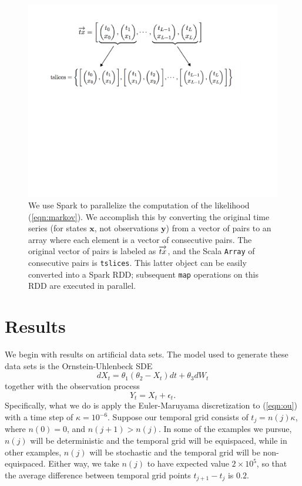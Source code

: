 \documentclass[wcp]{jmlr}
\begin{document}
\begin{figure}[ht]
\begin{center}
\includegraphics[width=6in]{vec_to_slice}
\end{center}
\caption{We use Spark to parallelize the computation of the likelihood
(\ref{eqn:markov}).  We accomplish this by converting the
original time series (for states $\mathbf{x}$, not observations
$\mathbf{y}$) from a vector of pairs to an array where each element is
a vector of consecutive pairs.  The original vector of pairs is
labeled as $\protect\overrightarrow{tx}$, and the Scala \texttt{Array}
of consecutive pairs is \texttt{tslices}.  This latter object can be
easily converted into a Spark RDD; subsequent \texttt{map} operations
on this RDD are executed in parallel.}
\label{fig:implementation2}
\end{figure}

\section{Results}
\label{sect:results}
We begin with results on artificial data sets.  The model used to
generate these data sets is the Ornstein-Uhlenbeck SDE
\begin{equation}
\label{eqn:ou}
{d}X_t = \theta_1 (\theta_2 - X_t) {d}t + \theta_3 {d}W_t
\end{equation}
together with the observation process
\begin{equation}
\label{eqn:ou_obs}
Y_t = X_t + \epsilon_t.
\end{equation}
Specifically, what we do is apply the Euler-Maruyama discretization to
(\ref{eqn:ou}) with a time step of $\kappa = 10^{-6}$.  Suppose our
temporal grid consists of $t_j = n(j) \kappa$, where $n(0) = 0$,
and $n(j+1) > n(j)$.  In some of the examples we pursue, $n(j)$ will
be deterministic and the temporal grid will be equispaced, while in other examples, $n(j)$ will
be stochastic and the temporal grid will be non-equispaced.  Either
way, we take $n(j)$ to have expected value $2 \times 10^5$, so that
the average difference between temporal grid points $t_{j+1} - t_j$ is $0.2$.
\end{document}
